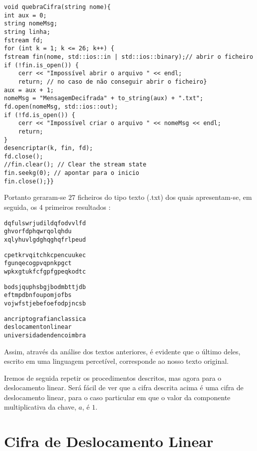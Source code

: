 \begin{lstlisting}[frame=single,mathescape=true,caption={Quebrar a cifra},captionpos=b,label={lst:Quebrar a cifra},basicstyle=\footnotesize]
void quebraCifra(string nome){
int aux = 0;
string nomeMsg;
string linha;
fstream fd;
for (int k = 1; k <= 26; k++) {
fstream fin(nome, std::ios::in | std::ios::binary);// abrir o ficheiro
if (!fin.is_open()) {
    cerr << "Impossível abrir o arquivo " << endl;
    return; // no caso de não conseguir abrir o ficheiro}
aux = aux + 1;
nomeMsg = "MensagemDecifrada" + to_string(aux) + ".txt";
fd.open(nomeMsg, std::ios::out);
if (!fd.is_open()) {
    cerr << "Impossível criar o arquivo " << nomeMsg << endl;
    return; 
}
desencriptar(k, fin, fd);
fd.close();
//fin.clear(); // Clear the stream state
fin.seekg(0); // apontar para o inicio
fin.close();}}
\end{lstlisting}
Portanto geraram-se $27$ ficheiros do tipo texto (.txt) dos quais apresentam-se, em seguida, os 4 primeiros resultados :
\begin{verbatim}
dqfulswrjudildqfodvvlfd
ghvorfdphqwrqolqhdu
xqlyhuvlgdghqghqfrlpeud
\end{verbatim}
\begin{verbatim}
cpetkrvqitchkcpencuukec
fgunqecogpvqpnkpgct
wpkxgtukfcfgpfgpeqkodtc
\end{verbatim}
\begin{verbatim}
bodsjquphsbgjbodmbttjdb
eftmpdbnfoupomjofbs
vojwfstjebefoefodpjncsb
\end{verbatim}
\begin{verbatim}
ancriptografianclassica
deslocamentonlinear
universidadendencoimbra
\end{verbatim}

Assim, através da análise dos textos anteriores, é evidente que o último deles, escrito em uma linguagem percetível, corresponde ao nosso texto original.

\medskip

Iremos de seguida repetir os procedimentos descritos, mas agora para o deslocamento
linear. Será fácil de ver que a cifra descrita acima é uma cifra de
deslocamento linear, para o caso particular em que o valor da componente multiplicativa da chave, $a$, é $1$.

\section{Cifra de Deslocamento Linear}
\label{sec:CifraDeslocamentoLinear}

